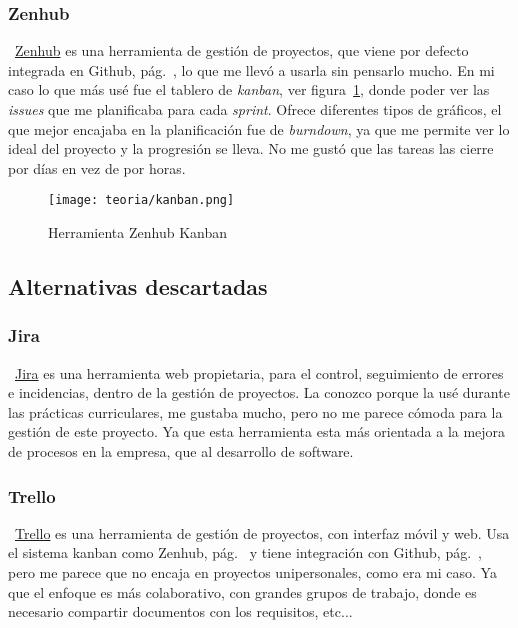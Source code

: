 \subsubsection{Zenhub}\label{zenhub}
~\href{https://bitbucket.org/product//}{Zenhub} es una herramienta de gestión de proyectos, que viene por defecto integrada en Github, pág.~\pageref{github}, lo que me llevó a usarla sin pensarlo mucho. En mi caso lo que más usé fue el tablero de \emph{kanban}, ver figura~\ref{fig:zenhub}, donde poder ver las \emph{issues} que me planificaba para cada \emph{sprint}. Ofrece diferentes tipos de gráficos, el que mejor encajaba en la planificación fue de \emph{burndown}, ya que me permite ver lo ideal del proyecto y la progresión se lleva. No me gustó que las tareas las cierre por días en vez de por horas.

\begin{figure}%
	\centering
	\texttt{[image: teoria/kanban.png]}
	\caption{Herramienta Zenhub Kanban}\label{fig:zenhub}
\end{figure}

\subsection{Alternativas descartadas}

\subsubsection{Jira}
~\href{https://www.atlassian.com/es/software/jira}{Jira} es una herramienta web propietaria, para el control, seguimiento de errores e incidencias, dentro de la gestión de proyectos. La conozco porque la usé durante las prácticas curriculares, me gustaba mucho, pero no me parece cómoda para la gestión de este proyecto. Ya que esta herramienta esta más orientada a la mejora de procesos en la empresa, que al desarrollo de software.

\subsubsection{Trello}
~\href{https://trello.com/es}{Trello} es una herramienta de gestión de proyectos, con interfaz móvil y web. Usa el sistema kanban como Zenhub, pág.~\pageref{zenhub} y tiene integración con Github, pág.~\pageref{github}, pero me parece que no encaja en proyectos unipersonales, como era mi caso. Ya que el enfoque es más colaborativo, con grandes grupos de trabajo, donde es necesario compartir documentos con los requisitos, etc...

